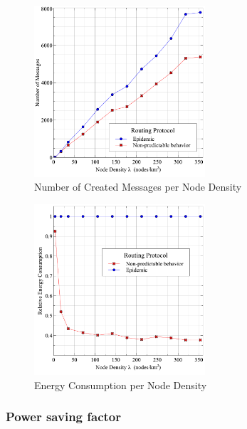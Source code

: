 \documentclass[conference]{IEEEtran}
\begin{document}
\begin{figure}[!t]
	\centering
	\includegraphics[width=2.5in]{Graphs/messages.pdf}
	\caption{Number of Created Messages per Node Density}
	\label{Number of Created Messages per Node Density}
\end{figure}

\begin{figure}[!t]
	\centering
	\includegraphics[width=2.5in]{Graphs/EnergyConsumption.pdf}
	\caption{Energy Consumption per Node Density}
	\label{Energy Consumption per Node Density}
\end{figure}

\subsubsection{Power saving factor}

\end{document}
